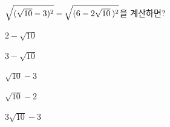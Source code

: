 $\sqrt{(\sqrt{10}-3)^2}-\sqrt{(6-2\sqrt{10}\mkern3mu )^2}$을 계산하면?
\begin{choicesii}{\rule[-3ex]{0pt}{8ex}$2-\sqrt{10}$}{\rule[-3ex]{0pt}{8ex}$3-\sqrt{10}$}{\rule[-3ex]{0pt}{8ex}$\sqrt{10}-3$}{\rule[-3ex]{0pt}{8ex}$\sqrt{10}-2$}{\rule[-3ex]{0pt}{8ex}$3\sqrt{10}-3$}\end{choicesii}
